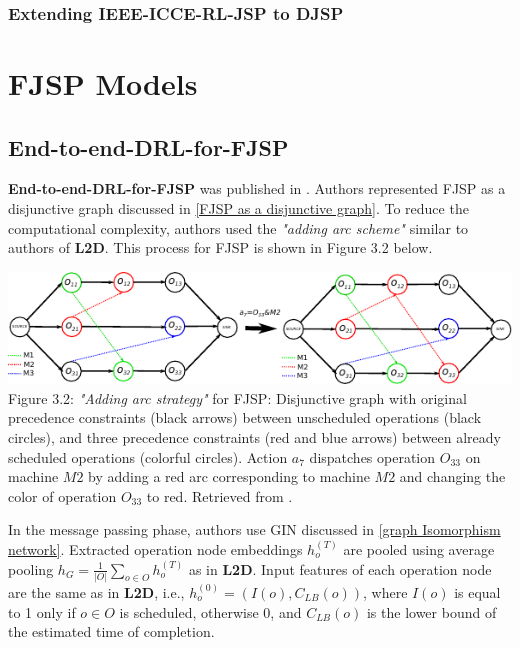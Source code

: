 \subsubsection{Extending IEEE-ICCE-RL-JSP to DJSP}


\section{FJSP Models}

\subsection{End-to-end-DRL-for-FJSP} 

\textbf{End-to-end-DRL-for-FJSP} was published in \cite{LEI2022117796}. Authors represented FJSP as a disjunctive graph discussed in \ref{FJSP as a disjunctive graph}. To reduce the computational complexity, authors used the \textit{"adding arc scheme"} similar to authors of \textbf{L2D}. This process for FJSP is shown in Figure 3.2 below.
\begin{center}
    \includegraphics[width=\linewidth]{images/fjsp_adding_arcs.pdf}\\
    Figure 3.2: \textit{"Adding arc strategy"} for FJSP: Disjunctive graph with original precedence constraints (black arrows) between unscheduled operations (black circles), and three precedence constraints (red and blue arrows) between already scheduled operations (colorful circles). Action $a_7$ dispatches operation $O_{33}$ on machine $M2$ by adding a red arc corresponding to machine $M2$ and changing the color of operation $O_{33}$ to red. Retrieved from \cite{LEI2022117796}.
\end{center}
In the message passing phase, authors use GIN discussed in \ref{graph Isomorphism network}. Extracted operation node embeddings $h_o^{(T)}$ are pooled using average pooling $h_G = \frac{1}{|O|} \sum_{o \in O} h_o^{(T)}$ as in \textbf{L2D}. Input features of each operation node are the same as in \textbf{L2D}, i.e., $h_o^{(0)} = (I(o), C_{LB}(o))$, where $I(o)$ is equal to 1 only if $o \in O$ is scheduled, otherwise 0, and $C_{LB}(o)$ is the lower bound of the estimated time of completion.
